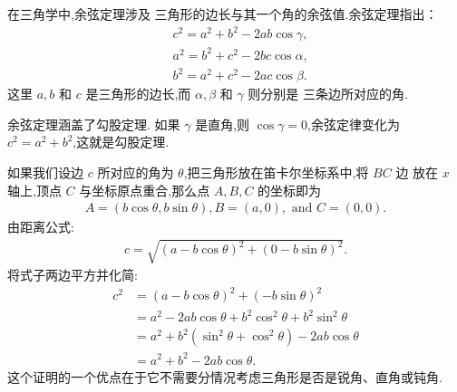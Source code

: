 \documentclass[main]{subfiles}
\begin{document}
在三角学中,余弦定理涉及
三角形的边长与其一个角的余弦值.余弦定理指出：
$$
\begin{aligned}
& c^2=a^2+b^2-2 a b \cos \gamma, \\
& a^2=b^2+c^2-2 b c \cos \alpha, \\
& b^2=a^2+c^2-2 a c \cos \beta .
\end{aligned}
$$
这里 $a, b$ 和 $c$ 是三角形的边长,而 $\alpha, \beta$ 和 $\gamma$ 则分别是
三条边所对应的角.

余弦定理涵盖了勾股定理.
如果 $\gamma$ 是直角,则 $\cos\gamma = 0$,余弦定律变化为 $c^2 = a^2 + b^2$,这就是勾股定理.

如果我们设边 $c$ 所对应的角为 $\theta$,把三角形放在笛卡尔坐标系中,将 $BC$ 边
放在 $x$ 轴上,顶点 $C$ 与坐标原点重合,那么点 $A,B,C$ 的坐标即为
$$
\begin{aligned}
  A=(b\cos \theta ,b\sin \theta ),
B=(a,0),{\text{ and }}C=(0,0).
\end{aligned}
$$
由距离公式:
$$
\begin{aligned}
  c={\sqrt {(a-b\cos \theta )^{2}+(0-b\sin \theta )^{2}}}.
\end{aligned}
$$
将式子两边平方并化简:
$$
\begin{aligned}
  c^{2}&=(a-b\cos \theta )^{2}+
  (-b\sin \theta )^{2}\\&=a^{2}-2ab\cos \theta +b^{2}
  \cos ^{2}\theta +b^{2}\sin ^{2}\theta \\&=a^{2}+b^{2}
  (\sin ^{2}\theta +\cos ^{2}\theta )-2ab\cos \theta \\
  &=a^{2}+b^{2}-2ab\cos \theta .
\end{aligned}
$$
这个证明的一个优点在于它不需要分情况考虑三角形是否是锐角、直角或钝角.
\end{document}
